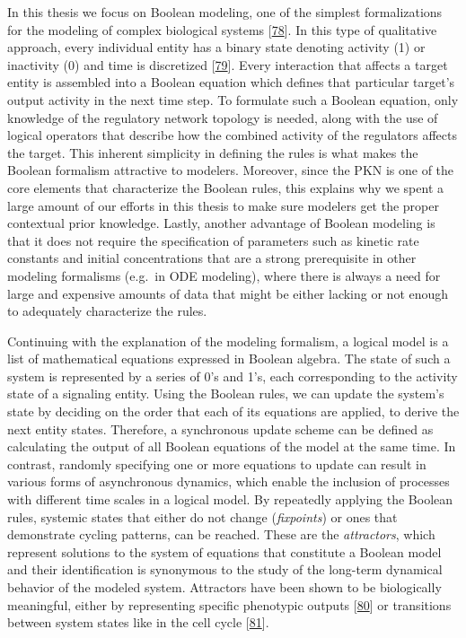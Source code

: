 \documentclass[
  12pt,
]{book}
\begin{document}
In this thesis we focus on Boolean modeling, one of the simplest formalizations for the modeling of complex biological systems {[}\protect\hyperlink{ref-Schwab2020}{78}{]}.
In this type of qualitative approach, every individual entity has a binary state denoting activity (1) or inactivity (0) and time is discretized {[}\protect\hyperlink{ref-Kauffman1969}{79}{]}.
Every interaction that affects a target entity is assembled into a Boolean equation which defines that particular target's output activity in the next time step.
To formulate such a Boolean equation, only knowledge of the regulatory network topology is needed, along with the use of logical operators that describe how the combined activity of the regulators affects the target.
This inherent simplicity in defining the rules is what makes the Boolean formalism attractive to modelers.
Moreover, since the PKN is one of the core elements that characterize the Boolean rules, this explains why we spent a large amount of our efforts in this thesis to make sure modelers get the proper contextual prior knowledge.
Lastly, another advantage of Boolean modeling is that it does not require the specification of parameters such as kinetic rate constants and initial concentrations that are a strong prerequisite in other modeling formalisms (e.g.~in ODE modeling), where there is always a need for large and expensive amounts of data that might be either lacking or not enough to adequately characterize the rules.

Continuing with the explanation of the modeling formalism, a logical model is a list of mathematical equations expressed in Boolean algebra.
The state of such a system is represented by a series of 0's and 1's, each corresponding to the activity state of a signaling entity.
Using the Boolean rules, we can update the system's state by deciding on the order that each of its equations are applied, to derive the next entity states.
Therefore, a synchronous update scheme can be defined as calculating the output of all Boolean equations of the model at the same time.
In contrast, randomly specifying one or more equations to update can result in various forms of asynchronous dynamics, which enable the inclusion of processes with different time scales in a logical model.
By repeatedly applying the Boolean rules, systemic states that either do not change (\emph{fixpoints}) or ones that demonstrate cycling patterns, can be reached.
These are the \emph{attractors}, which represent solutions to the system of equations that constitute a Boolean model and their identification is synonymous to the study of the long-term dynamical behavior of the modeled system.
Attractors have been shown to be biologically meaningful, either by representing specific phenotypic outputs {[}\protect\hyperlink{ref-Kauffman1993}{80}{]} or transitions between system states like in the cell cycle {[}\protect\hyperlink{ref-Faure2006}{81}{]}.
\end{document}
